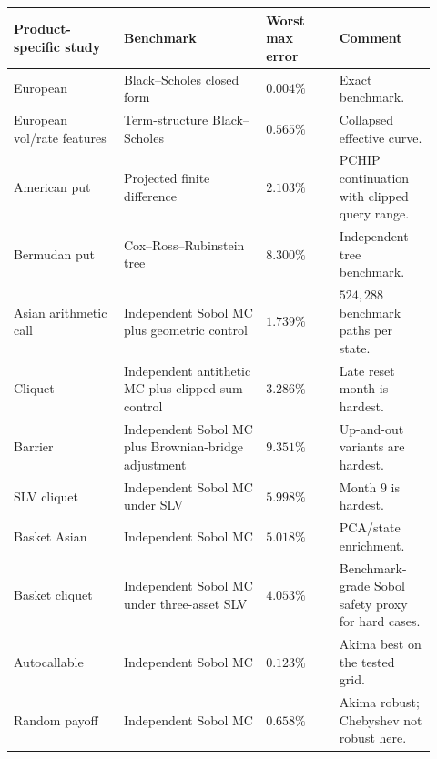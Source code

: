 \documentclass[11pt,oneside]{book}
\theoremstyle{definition}
\begin{document}
\begin{longtable}{@{}>{\raggedright\arraybackslash}p{0.24\linewidth}>{\raggedright\arraybackslash}p{0.31\linewidth}>{\raggedleft\arraybackslash}p{0.16\linewidth}>{\raggedright\arraybackslash}p{0.21\linewidth}@{}}
\toprule
Product-specific study & Benchmark & Worst max error & Comment\\
\midrule
European & Black--Scholes closed form & \(0.004\%\) & Exact benchmark.\\
European vol/rate features & Term-structure Black--Scholes & \(0.565\%\) & Collapsed effective curve.\\
American put & Projected finite difference & \(2.103\%\) & PCHIP continuation with clipped query range.\\
Bermudan put & Cox--Ross--Rubinstein tree & \(8.300\%\) & Independent tree benchmark.\\
Asian arithmetic call & Independent Sobol MC plus geometric control & \(1.739\%\) & \(524{,}288\) benchmark paths per state.\\
Cliquet & Independent antithetic MC plus clipped-sum control & \(3.286\%\) & Late reset month is hardest.\\
Barrier & Independent Sobol MC plus Brownian-bridge adjustment & \(9.351\%\) & Up-and-out variants are hardest.\\
SLV cliquet & Independent Sobol MC under SLV & \(5.998\%\) & Month \(9\) is hardest.\\
Basket Asian & Independent Sobol MC & \(5.018\%\) & PCA/state enrichment.\\
Basket cliquet & Independent Sobol MC under three-asset SLV & \(4.053\%\) & Benchmark-grade Sobol safety proxy for hard cases.\\
Autocallable & Independent Sobol MC & \(0.123\%\) & Akima best on the tested grid.\\
Random payoff & Independent Sobol MC & \(0.658\%\) & Akima robust; Chebyshev not robust here.\\
\bottomrule
\end{longtable}
\end{document}

